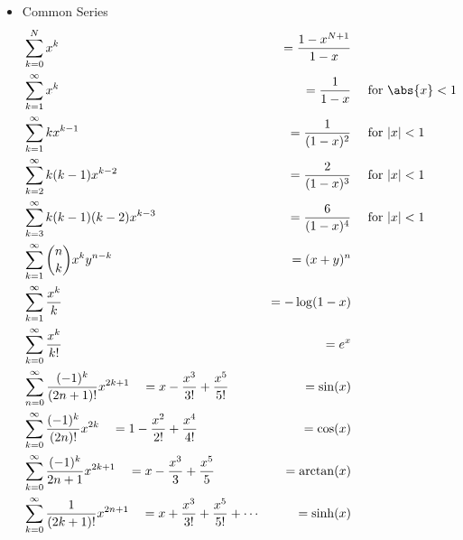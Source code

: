 \begin{itemize}
\tightlist
\item
  Common Series
  \begin{align*}
  &\sum_{k=0}^{N} x^k                                                                                                                        &=  \frac{1-x^{N+1}}{1-x} &\\
  &\sum_{k=1}^\infty x^k                                                                                                                     &=  \frac{1}{1-x}& \quad\text{ for } \abs{x} < 1 \\
  &\sum_{k=1}^{\infty } k x ^ {k - 1 }                                                                                                       &=  \frac{1}{( 1 - x ) ^ { 2 } }& \quad \text { for } | x | < 1 \\
  &\sum_{k=2}^{\infty } k ( k - 1 ) x ^ {k - 2 }                                                                                             &=  \frac{2}{( 1 - x ) ^ { 3 } } & \quad \text { for } | x | < 1  \\
  &\sum_{k=3}^{\infty } k ( k - 1 ) ( k - 2 ) x ^ {k - 3 }                                                                                   &=  \frac{6}{( 1 - x ) ^ { 4 } } & \quad \text { for } | x | < 1   \\
  &\sum_{k=1}^\infty {n\choose k} x^k y^{n-k}                                                                                                &=  (x+y)^n& \\
  &\sum_{k=1}^{\infty } \frac{x ^ {k } } {k }                                                                                                &=  -\log ( 1 - x )& \\
  &\sum_{k=0}^{\infty } \frac{x ^ {k } } {k ! }                                                                                              &=  e^x & \\
  &\sum_{ n = 0}^{\infty } \frac{( - 1 ) ^ {k }}{( 2 n + 1 ) ! } x ^ { 2 k + 1 } \quad = x - \frac{x ^ { 3 }}{3 ! } + \frac{x ^ { 5 }}{5 ! } &=  \sin(x) & \\
  &\sum_{k=0}^{\infty } \frac{( - 1 ) ^ {k }}{( 2 n ) ! } x ^ { 2 k } \quad = 1 - \frac{x ^ { 2 }}{2 ! } + \frac{x ^ { 4 }}{4 ! }            &=  \cos(x)& \\
  &\sum_{k=0}^{\infty } \frac{( - 1 ) ^ {k }}{2 n + 1 } x ^ { 2 k + 1 } \quad = x - \frac{x ^ { 3 }}{3 } + \frac{x ^ { 5 }}{5 }              &=  \arctan(x) & \\
  &\sum_{k=0}^{\infty } \frac{1}{( 2 k + 1 ) ! }x ^ { 2 n + 1 } \quad = x + \frac{x ^ { 3 }}{3 ! } + \frac{x ^ { 5 }}{5 ! } + \cdots         &=  \sinh(x) & \\

\end{align*}
\end{itemize}
